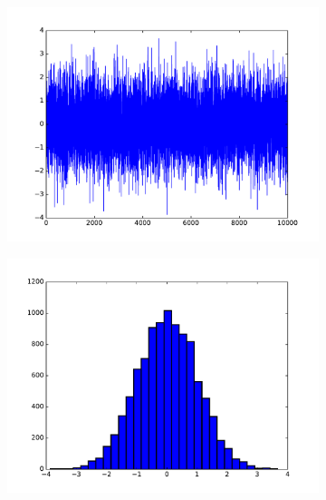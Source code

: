 \begin{figure}[H] %
\captionsetup[subfigure]{justification=centering}
\centering
\begin{subfigure}{.49\textwidth}
    \centering
    \includegraphics[width=\linewidth]{figures/hist_1_bad.pdf}
\end{subfigure}
%
\begin{subfigure}{.49\textwidth}
    \centering
    \includegraphics[width=\linewidth]{figures/hist_1_good.pdf}
\end{subfigure}
\end{figure}


